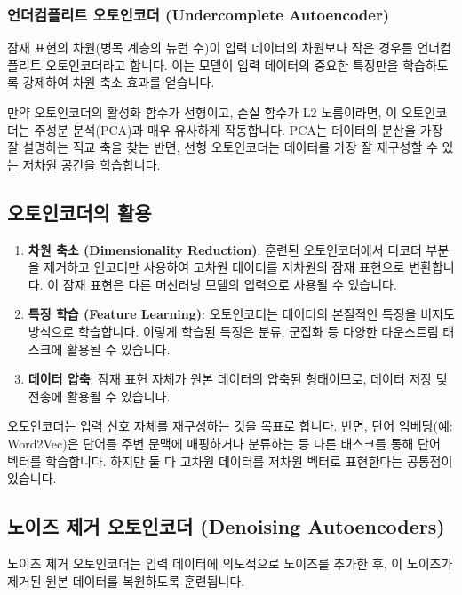\documentclass[11pt,a4paper]{article}
\theoremstyle{definition}
\begin{document}
\subsubsection{언더컴플리트 오토인코더 (Undercomplete Autoencoder)}
잠재 표현의 차원(병목 계층의 뉴런 수)이 입력 데이터의 차원보다 작은 경우를 언더컴플리트 오토인코더라고 합니다. 이는 모델이 입력 데이터의 중요한 특징만을 학습하도록 강제하여 차원 축소 효과를 얻습니다.

\begin{infobox}
만약 오토인코더의 활성화 함수가 선형이고, 손실 함수가 L2 노름이라면, 이 오토인코더는 주성분 분석(PCA)과 매우 유사하게 작동합니다. PCA는 데이터의 분산을 가장 잘 설명하는 직교 축을 찾는 반면, 선형 오토인코더는 데이터를 가장 잘 재구성할 수 있는 저차원 공간을 학습합니다.
\end{infobox}

\subsection{오토인코더의 활용}
\begin{enumerate}
    \item \textbf{차원 축소 (Dimensionality Reduction)}: 훈련된 오토인코더에서 디코더 부분을 제거하고 인코더만 사용하여 고차원 데이터를 저차원의 잠재 표현으로 변환합니다. 이 잠재 표현은 다른 머신러닝 모델의 입력으로 사용될 수 있습니다.
    \item \textbf{특징 학습 (Feature Learning)}: 오토인코더는 데이터의 본질적인 특징을 비지도 방식으로 학습합니다. 이렇게 학습된 특징은 분류, 군집화 등 다양한 다운스트림 태스크에 활용될 수 있습니다.
    \item \textbf{데이터 압축}: 잠재 표현 자체가 원본 데이터의 압축된 형태이므로, 데이터 저장 및 전송에 활용될 수 있습니다.
\end{enumerate}

\begin{infobox}
오토인코더는 입력 신호 자체를 재구성하는 것을 목표로 합니다. 반면, 단어 임베딩(예: Word2Vec)은 단어를 주변 문맥에 매핑하거나 분류하는 등 다른 태스크를 통해 단어 벡터를 학습합니다. 하지만 둘 다 고차원 데이터를 저차원 벡터로 표현한다는 공통점이 있습니다.
\end{infobox}

\subsection{노이즈 제거 오토인코더 (Denoising Autoencoders)}
노이즈 제거 오토인코더는 입력 데이터에 의도적으로 노이즈를 추가한 후, 이 노이즈가 제거된 원본 데이터를 복원하도록 훈련됩니다.
\end{document}
